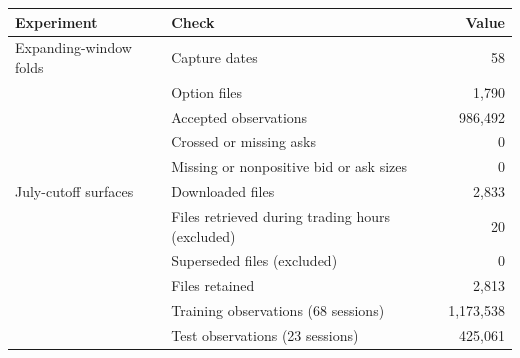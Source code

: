 \begin{tabular}{llr}
\toprule
Experiment & Check & Value \\
\midrule
Expanding-window folds & Capture dates & 58 \\
 & Option files & 1,790 \\
 & Accepted observations & 986,492 \\
 & Crossed or missing asks & 0 \\
 & Missing or nonpositive bid or ask sizes & 0 \\
\midrule
July-cutoff surfaces & Downloaded files & 2,833 \\
 & Files retrieved during trading hours (excluded) & 20 \\
 & Superseded files (excluded) & 0 \\
 & Files retained & 2,813 \\
 & Training observations (68 sessions) & 1,173,538 \\
 & Test observations (23 sessions) & 425,061 \\
\bottomrule\end{tabular}
